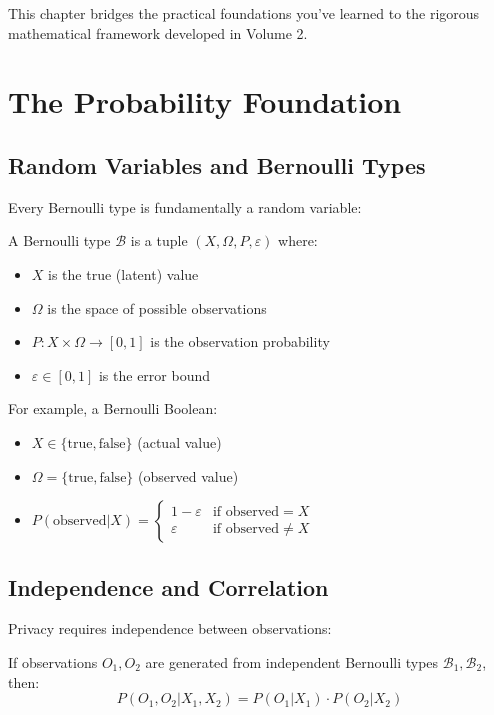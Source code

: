 This chapter bridges the practical foundations you've learned to the rigorous mathematical framework developed in Volume 2.

\section{The Probability Foundation}

\subsection{Random Variables and Bernoulli Types}

Every Bernoulli type is fundamentally a random variable:

\begin{definition}
A Bernoulli type $\mathcal{B}$ is a tuple $(X, \Omega, P, \varepsilon)$ where:
\begin{itemize}
\item $X$ is the true (latent) value
\item $\Omega$ is the space of possible observations
\item $P: X \times \Omega \to [0,1]$ is the observation probability
\item $\varepsilon \in [0,1]$ is the error bound
\end{itemize}
\end{definition}

For example, a Bernoulli Boolean:
\begin{itemize}
\item $X \in \{\text{true}, \text{false}\}$ (actual value)
\item $\Omega = \{\text{true}, \text{false}\}$ (observed value)
\item $P(\text{observed} | X) = \begin{cases}
    1 - \varepsilon & \text{if observed} = X \\
    \varepsilon & \text{if observed} \neq X
\end{cases}$
\end{itemize}

\subsection{Independence and Correlation}

Privacy requires independence between observations:

\begin{theorem}
If observations $O_1, O_2$ are generated from independent Bernoulli types $\mathcal{B}_1, \mathcal{B}_2$, then:
$$P(O_1, O_2 | X_1, X_2) = P(O_1 | X_1) \cdot P(O_2 | X_2)$$
\end{theorem}

